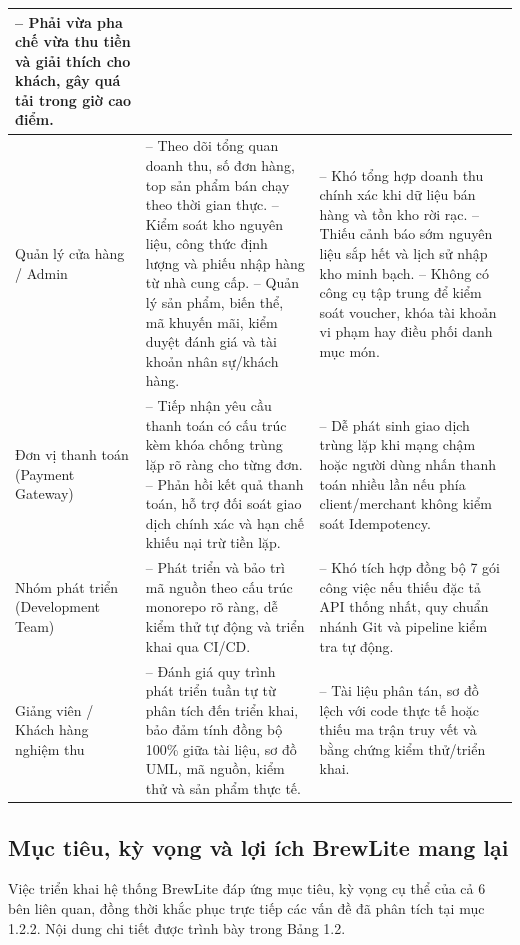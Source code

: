 \documentclass[12pt,a4paper]{report}
\begin{document}
\begin{longtable}{>{\raggedright\arraybackslash}p{3.0cm}>{\raggedright\arraybackslash}p{6.0cm}>{\raggedright\arraybackslash}p{6.0cm}}
-- Phải vừa pha chế vừa thu tiền và giải thích cho khách, gây quá tải trong giờ cao điểm. \\
\hline
Quản lý cửa hàng / Admin
& -- Theo dõi tổng quan doanh thu, số đơn hàng, top sản phẩm bán chạy theo thời gian thực. \newline
-- Kiểm soát kho nguyên liệu, công thức định lượng và phiếu nhập hàng từ nhà cung cấp. \newline
-- Quản lý sản phẩm, biến thể, mã khuyến mãi, kiểm duyệt đánh giá và tài khoản nhân sự/khách hàng.
& -- Khó tổng hợp doanh thu chính xác khi dữ liệu bán hàng và tồn kho rời rạc. \newline
-- Thiếu cảnh báo sớm nguyên liệu sắp hết và lịch sử nhập kho minh bạch. \newline
-- Không có công cụ tập trung để kiểm soát voucher, khóa tài khoản vi phạm hay điều phối danh mục món. \\
\hline
Đơn vị thanh toán (Payment Gateway)
& -- Tiếp nhận yêu cầu thanh toán có cấu trúc kèm khóa chống trùng lặp rõ ràng cho từng đơn. \newline
-- Phản hồi kết quả thanh toán, hỗ trợ đối soát giao dịch chính xác và hạn chế khiếu nại trừ tiền lặp.
& -- Dễ phát sinh giao dịch trùng lặp khi mạng chậm hoặc người dùng nhấn thanh toán nhiều lần nếu phía client/merchant không kiểm soát Idempotency. \\
\hline
Nhóm phát triển (Development Team)
& -- Phát triển và bảo trì mã nguồn theo cấu trúc monorepo rõ ràng, dễ kiểm thử tự động và triển khai qua CI/CD.
& -- Khó tích hợp đồng bộ 7 gói công việc nếu thiếu đặc tả API thống nhất, quy chuẩn nhánh Git và pipeline kiểm tra tự động. \\
\hline
Giảng viên / Khách hàng nghiệm thu
& -- Đánh giá quy trình phát triển tuần tự từ phân tích đến triển khai, bảo đảm tính đồng bộ 100\% giữa tài liệu, sơ đồ UML, mã nguồn, kiểm thử và sản phẩm thực tế.
& -- Tài liệu phân tán, sơ đồ lệch với code thực tế hoặc thiếu ma trận truy vết và bằng chứng kiểm thử/triển khai. \\
\hline
\end{longtable}

\subsection{Mục tiêu, kỳ vọng và lợi ích BrewLite mang lại}

Việc triển khai hệ thống BrewLite đáp ứng mục tiêu, kỳ vọng cụ thể của cả 6 bên liên quan, đồng thời khắc phục trực tiếp các vấn đề đã phân tích tại mục 1.2.2. Nội dung chi tiết được trình bày trong Bảng 1.2.
\end{document}

